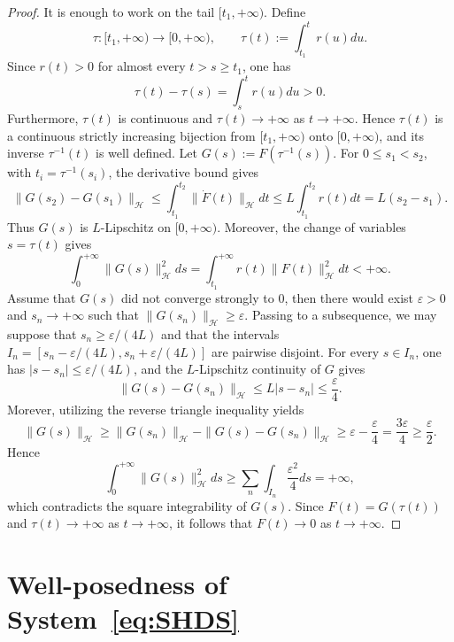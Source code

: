 \documentclass{article}
\theoremstyle{definition}
\theoremstyle{definition}
\theoremstyle{definition}
\begin{document}
\begin{proof}
It is enough to work on the tail $[t_1,+\infty)$. Define
\[
\tau:[t_1,+\infty)\to[0,+\infty),\qquad
\tau(t):=\int_{t_1}^{t}r(u)du .
\]
Since $r(t)>0$ for almost every $t > s \geq t_1$, one has
\[
\tau(t)-\tau(s)=\int_s^t r(u)du>0.
\]
Furthermore, $\tau(t)$ is continuous and $\tau(t)\to+\infty$ as $t\to+\infty$. Hence $\tau(t)$ is a continuous strictly increasing bijection from $[t_1,+\infty)$ onto $[0,+\infty)$, and its inverse $\tau^{-1}(t)$ is well defined. Let $G(s):=F(\tau^{-1}(s))$. For $0\le s_1<s_2$, with $t_i=\tau^{-1}(s_i)$, the derivative bound gives
\[
\|G(s_2)-G(s_1)\|_{\mathcal{H}}
\le \int_{t_1}^{t_2}\|\dot F(t)\|_{\mathcal{H}}dt
\le L\int_{t_1}^{t_2}r(t)dt
=L(s_2-s_1).
\]
Thus $G(s)$ is $L$-Lipschitz on $[0,+\infty)$. Moreover, the change of variables $s=\tau(t)$ gives
\[
\int_0^{+\infty}\|G(s)\|_{\mathcal{H}}^2ds
=\int_{t_1}^{+\infty}r(t)\|F(t)\|_{\mathcal{H}}^2dt<+\infty.
\]
Assume that $G(s)$ did not converge strongly to $0$, then there would exist $\varepsilon>0$ and $s_n\to+\infty$ such that $\|G(s_n)\|_{\mathcal{H}}\ge\varepsilon$. Passing to a subsequence, we may suppose that $s_n\ge \varepsilon/(4L)$ and that the intervals
$I_n=[s_n-\varepsilon/(4L),s_n+\varepsilon/(4L)]$ are pairwise disjoint. For every $s\in I_n$, one has $|s-s_n|\le \varepsilon/(4L)$, and the $L$-Lipschitz continuity of $G$ gives
\[
\|G(s)-G(s_n)\|_{\mathcal{H}}\le L|s-s_n|\le\frac{\varepsilon}{4}.
\]
Morever, utilizing the reverse triangle inequality yields
\[
\|G(s)\|_{\mathcal{H}}
\ge \|G(s_n)\|_{\mathcal{H}}-\|G(s)-G(s_n)\|_{\mathcal{H}}
\ge \varepsilon-\frac{\varepsilon}{4}
=\frac{3\varepsilon}{4}\ge\frac{\varepsilon}{2}.
\]
Hence
\[
\int_0^{+\infty}\|G(s)\|_{\mathcal{H}}^2ds
\ge \sum_n \int_{I_n}\frac{\varepsilon^2}{4}ds=+\infty,
\]
which contradicts the square integrability of $G(s)$. Since $F(t)=G(\tau(t))$ and $\tau(t)\to+\infty$ as $t\to+\infty$, it follows that $F(t)\to0$ as $t\to+\infty$.
\end{proof}

\section{Well-posedness of System\texorpdfstring{~\eqref{eq:SHDS}}{ (SHDS)}}
\label{sec:existence}
\end{document}
